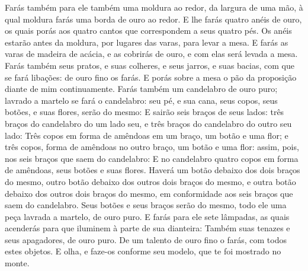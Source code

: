 {Farás também para ele também uma moldura ao redor, da largura de uma mão, à qual moldura farás uma borda de ouro ao redor.
E lhe farás quatro anéis de ouro, os quais porás aos quatro cantos que correspondem a seus quatro pés.
Os anéis estarão antes da moldura, por lugares das varas, para levar a mesa.
E farás as varas de madeira de acácia, e as cobrirás de ouro, e com elas será levada a mesa.
Farás também seus pratos, e suas colheres, e seus jarros, e suas bacias, com que se fará libações: de ouro fino os farás.
E porás sobre a mesa o pão da proposição diante de mim continuamente.
Farás também um candelabro de ouro puro; lavrado a martelo se fará o candelabro: seu pé, e sua cana, seus copos, seus botões, e suas flores, serão do mesmo:
E sairão seis braços de seus lados: três braços do candelabro do um lado seu, e três braços do candelabro do outro seu lado:
Três copos em forma de amêndoas em um braço, um botão e uma flor; e três copos, forma de amêndoas no outro braço, um botão e uma flor: assim, pois, nos seis braços que saem do candelabro:
E no candelabro quatro copos em forma de amêndoas, seus botões e suas flores.
Haverá um botão debaixo dos dois braços do mesmo, outro botão debaixo dos outros dois braços do mesmo, e outra botão debaixo dos outros dois braços do mesmo, em conformidade aos seis braços que saem do candelabro.
Seus botões e seus braços serão do mesmo, todo ele uma peça lavrada a martelo, de ouro puro.
E farás para ele sete lâmpadas, as quais acenderás para que iluminem à parte de sua dianteira:
Também suas tenazes e seus apagadores, de ouro puro.
De um talento de ouro fino o farás, com todos estes objetos.
E olha, e faze-os conforme seu modelo, que te foi mostrado no monte.

}
